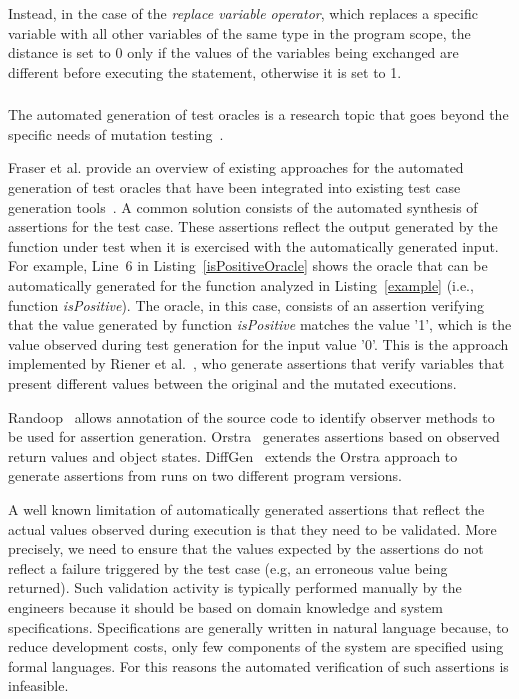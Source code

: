 Instead, in the case of the \textit{replace variable operator}, which replaces a specific variable with all other variables of the same type in the program scope, the distance is set to 0 only if the values of the variables being exchanged are different before executing the statement, otherwise it is set to 1.

\subsubsection{}
\label{sec:oraclesGeneration:codeDriven}

The automated generation of test oracles is a research topic that goes beyond the specific needs of mutation testing~\cite{Barr:Oracles:15,OLIVEIRA:Oracles:2014}.

Fraser et al. provide an overview of existing approaches for the automated generation of test oracles that have been integrated into existing test case generation tools~\cite{fraser2011mutation}.
A common solution consists of the automated synthesis of assertions for the test case. These assertions reflect the output generated by the function under test when it is exercised with the automatically generated input. 
For example, Line~6 in Listing~\ref{isPositiveOracle} shows the oracle that can be automatically generated for the function analyzed in Listing~\ref{example} (i.e., function \emph{isPositive}). The oracle, in this case, consists of an assertion verifying that the value generated by function \emph{isPositive} matches the value '1', which is the value observed during test generation for the input value '0'. This is the approach implemented by Riener et al.~\cite{riener2011test}, who generate assertions that verify variables that present different values between the original and the mutated executions.



Randoop~\cite{PachecoLEB2007} allows annotation of the source code to identify observer methods to be used for assertion generation. Orstra~\cite{Xie:2006} generates assertions based on observed return values and object states.
DiffGen~\cite{Taneja:2008} extends the Orstra approach to generate assertions from runs on two different program versions.

A well known limitation of automatically generated assertions that reflect the actual values observed during execution is that
they need to be validated. More precisely, we need to ensure that the values expected by the assertions do not reflect a failure triggered by the test case (e.g, an erroneous value being returned). Such validation activity is typically performed manually by the engineers because it should be based on domain knowledge and system specifications. 
Specifications are generally written in natural language because, to reduce development costs, only few components of the system are specified using formal languages. For this reasons the automated verification of such assertions is infeasible.

